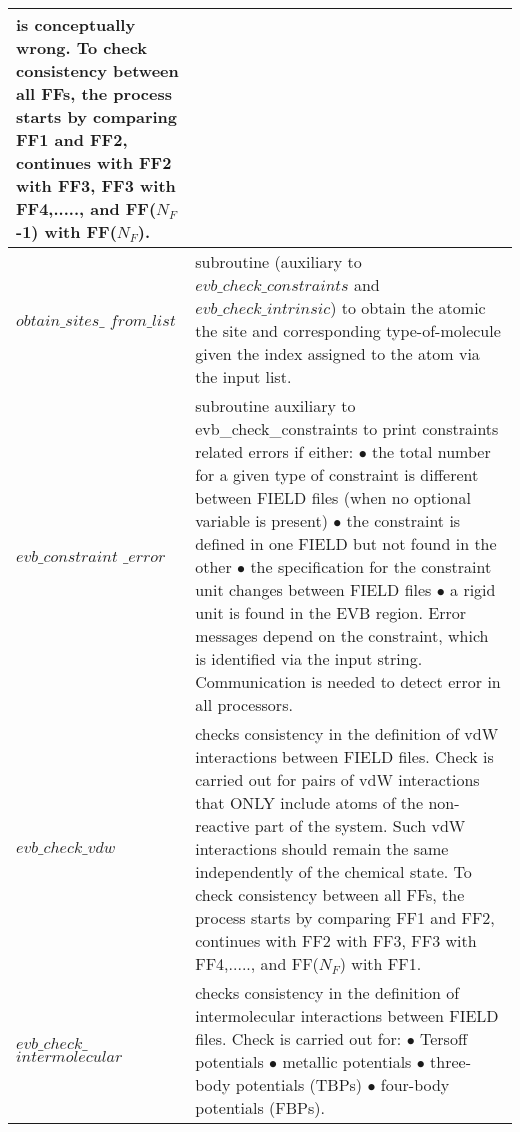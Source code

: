 \begin{center}
\begin{longtable*}[t]{p{0.15\textwidth}|p{0.85\textwidth}}
is conceptually wrong.\newline
To check consistency between all FFs, the process starts by comparing FF1 and FF2,
continues with FF2 with FF3, FF3 with FF4,....., and FF($N_F$-1) with FF($N_F$).\\
\hline
$obtain\_sites\_$ $from\_list$ &  subroutine (auxiliary to $evb\_check\_constraints$ and $evb\_check\_intrinsic$)
to obtain the atomic the site and corresponding type-of-molecule given the index assigned to the atom via the input list.
 \\
\hline
$evb\_constraint$ $\_error$ & subroutine auxiliary to evb\_check\_constraints to print constraints related errors if either:\newline
$\bullet$ the total number for a given type of constraint is different between FIELD files (when no optional variable is present)\newline
$\bullet$ the constraint is defined in one FIELD but not found in the other\newline
$\bullet$ the specification for the constraint unit changes between FIELD files\newline
$\bullet$ a rigid unit is found in the EVB region.\newline
Error messages depend on the constraint, which is identified via the input string. Communication is needed to detect error in all processors.\\
\hline
$evb\_check\_vdw$ & checks consistency in the definition of vdW
interactions between FIELD files. Check is carried out for pairs of vdW
interactions that ONLY include atoms of the non-reactive part of the system. Such
vdW interactions should remain the same independently of the chemical state.
To check consistency between all FFs, the process starts by comparing FF1 and FF2,
continues with FF2 with FF3, FF3 with FF4,....., and FF($N_F$) with FF1.\\
\hline 
$evb\_check\_$ $intermolecular$ & checks consistency in the definition of intermolecular
interactions between FIELD files. Check is carried out for:\newline
$\bullet$ Tersoff potentials\newline
$\bullet$ metallic potentials\newline
$\bullet$ three-body potentials (TBPs)\newline
$\bullet$ four-body potentials (FBPs).\newline


\end{longtable*}
\end{center}
